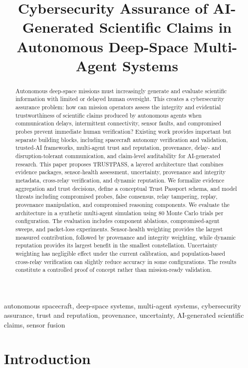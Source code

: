 \documentclass[10pt,conference]{IEEEtran}
\title{Cybersecurity Assurance of AI-Generated Scientific Claims in Autonomous Deep-Space Multi-Agent Systems}
\author{
  \IEEEauthorblockN{Abba Abdullahi Wakili}
  \IEEEauthorblockA{
    \textit{Independent Researcher}\\
    Kano, Nigeria\\
    \textit{B.Sc. Computer Science, Bayero University Kano (2025)}\\
    \href{mailto:abbaabdullahiwakeel@gmail.com}
    {abbaabdullahiwakeel@gmail.com}
  }
}
\begin{document}
\raggedbottom
\maketitle

\begin{abstract}
Autonomous deep-space missions must increasingly generate and evaluate scientific information with limited or delayed human oversight. This creates a cybersecurity assurance problem: how can mission operators assess the integrity and evidential trustworthiness of scientific claims produced by autonomous agents when communication delays, intermittent connectivity, sensor faults, and compromised probes prevent immediate human verification? Existing work provides important but separate building blocks, including spacecraft autonomy verification and validation, trusted-AI frameworks, multi-agent trust and reputation, provenance, delay- and disruption-tolerant communication, and claim-level auditability for AI-generated research. This paper proposes TRUSTPASS, a layered architecture that combines evidence packages, sensor-health assessment, uncertainty, provenance and integrity metadata, cross-relay verification, and dynamic reputation. We formalize evidence aggregation and trust decisions, define a conceptual Trust Passport schema, and model threats including compromised probes, false consensus, relay tampering, replay, provenance manipulation, and compromised reasoning components. We evaluate the architecture in a synthetic multi-agent simulation using 80 Monte Carlo trials per configuration. The evaluation includes component ablations, compromised-agent sweeps, and packet-loss experiments. Sensor-health weighting provides the largest measured contribution, followed by provenance and integrity weighting, while dynamic reputation provides its largest benefit in the smallest constellation. Uncertainty weighting has negligible effect under the current calibration, and population-based cross-relay verification can slightly reduce accuracy in some configurations. The results constitute a controlled proof of concept rather than mission-ready validation.
\end{abstract}

\begin{IEEEkeywords}
autonomous spacecraft, deep-space systems, multi-agent systems, cybersecurity assurance, trust and reputation, provenance, uncertainty, AI-generated scientific claims, sensor fusion
\end{IEEEkeywords}

\section{Introduction}
\label{sec:introduction}
\end{document}
